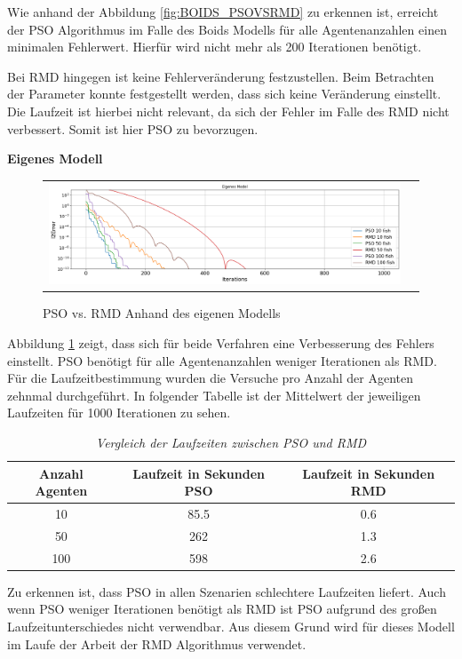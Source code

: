 Wie anhand der Abbildung \ref{fig:BOIDS_PSOVSRMD} zu erkennen ist, erreicht der PSO Algorithmus im Falle des Boids Modells für alle Agentenanzahlen einen minimalen Fehlerwert. Hierfür wird nicht mehr als 200 Iterationen benötigt.

Bei RMD hingegen ist keine Fehlerveränderung festzustellen. Beim Betrachten der Parameter konnte festgestellt werden, dass sich keine Veränderung einstellt. Die Laufzeit ist hierbei nicht relevant, da sich der Fehler im Falle des RMD nicht verbessert.
Somit ist hier PSO zu bevorzugen.

\textbf{Eigenes Modell}

\begin{figure}[h]
\centering
\begin{tabular}{cc}
\includegraphics[width=1.0\textwidth]{figures/Experimente/Eigenes_Laufzeit.png} 
\end{tabular}
\caption{PSO vs. RMD Anhand des eigenen Modells \label{fig:Eigen_PSOVSRMD}}
\end{figure}

Abbildung \ref{fig:Eigen_PSOVSRMD} zeigt, dass sich für beide Verfahren eine Verbesserung des Fehlers einstellt.
PSO benötigt für alle Agentenanzahlen weniger Iterationen als RMD. 
Für die Laufzeitbestimmung wurden die Versuche pro Anzahl der Agenten zehnmal durchgeführt.
In folgender Tabelle ist der Mittelwert der jeweiligen Laufzeiten für 1000 Iterationen zu sehen.

\begin{table}[h]
	\centering
	\begin{tabular}{ccc}
	Anzahl Agenten & Laufzeit in Sekunden PSO & Laufzeit in Sekunden RMD \\
	\hline
	10 & 85.5 & 0.6 \\
	50 & 262 & 1.3\\
	100 & 598 & 2.6\\
	\end{tabular}
	\caption{\textit{Vergleich der Laufzeiten zwischen PSO und RMD}}
			\label{table:Laufzeiten}
\end{table}

Zu erkennen ist, dass PSO in allen Szenarien schlechtere Laufzeiten liefert. 
Auch wenn PSO weniger Iterationen benötigt als RMD ist PSO aufgrund des großen Laufzeitunterschiedes nicht verwendbar. Aus diesem Grund wird für dieses Modell im Laufe der Arbeit der RMD Algorithmus verwendet.

